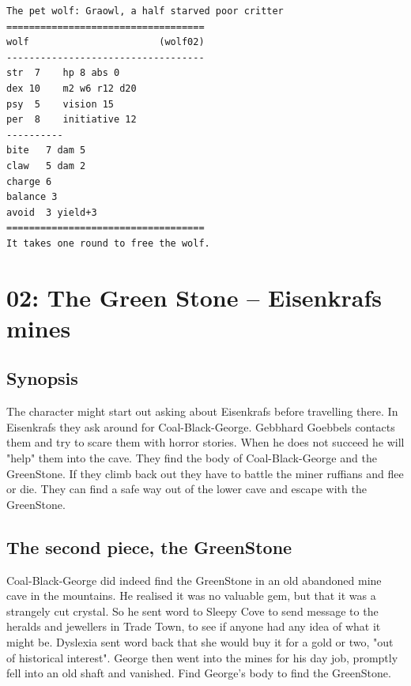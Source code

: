 \documentclass[11pt, twoside, titlepage, a4paper]{report}
\renewcommand{\chaptermark}[1]{\markboth{#1}{}}
\begin{document}
\begin{verbatim}
\end{verbatim} \goodbreak \begin{verbatim}
The pet wolf: Graowl, a half starved poor critter
===================================
wolf                       (wolf02)
-----------------------------------
str  7    hp 8 abs 0
dex 10    m2 w6 r12 d20
psy  5    vision 15
per  8    initiative 12
----------
bite   7 dam 5
claw   5 dam 2
charge 6
balance 3
avoid  3 yield+3
===================================
It takes one round to free the wolf.
\end{verbatim}\normalsize


















\clearpage
{}
\section*{02: The Green Stone -- Eisenkrafs mines}
\chaptermark{green stone}


\subsection*{Synopsis}
The character might start out asking about Eisenkrafs before travelling there. In Eisenkrafs they ask around for Coal-Black-George. Gebbhard Goebbels contacts them and try to scare them with horror stories. When he does not succeed he will "help" them into the cave. They find the body of Coal-Black-George and the GreenStone. If they climb back out they have to battle the miner ruffians and flee or die. They can find a safe way out of the lower cave and escape with the GreenStone.


\subsection*{The second piece, the GreenStone}
Coal-Black-George did indeed find the GreenStone in an old abandoned mine cave in the mountains. He realised it was no valuable gem, but that it was a strangely cut crystal. So he sent word to Sleepy Cove to send message to the heralds and jewellers in Trade Town, to see if anyone had any idea of what it might be. Dyslexia sent word back that she would buy it for a gold or two, "out of historical interest". George then went into the mines for his day job, promptly fell into an old shaft and vanished. Find George's body to find the GreenStone.
\end{document}
